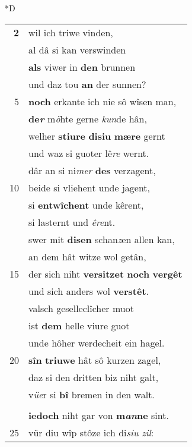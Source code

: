 \documentclass[8pt,a4paper,notitlepage]{article}
\begin{document}
\begin{table}[ht]
\begin{minipage}[t]{0.5\linewidth}
\small
\begin{center}*D
\end{center}
\begin{tabular}{rl}
\textbf{2} & wil ich triwe vinden,\\ 
 & al dâ si kan verswinden\\ 
 & \textbf{als} viwer in \textbf{den} brunnen\\ 
 & und daz tou \textbf{an} der sunnen?\\ 
5 & \textbf{noch} erkante ich nie sô wîsen man,\\ 
 & \textbf{de\textit{r}} m\textit{ö}hte gerne \textit{kun}de hân,\\ 
 & welher \textbf{stiure} \textbf{disiu} \textbf{mære} gernt\\ 
 & und waz si guoter lê\textit{re} wernt.\\ 
 & dâr an si ni\textit{mer} \textbf{des} verzagent,\\ 
10 & beide si vliehent unde jagent,\\ 
 & si \textbf{entwîchent} unde kêrent,\\ 
 & si lasternt und \textit{êre}nt.\\ 
 & swer mit \textbf{disen} schan\textit{z}en allen kan,\\ 
 & an dem hât witze wol getân,\\ 
15 & der sich niht \textbf{versitzet} \textbf{noch} \textbf{vergêt}\\ 
 & und sich anders wol \textbf{verstêt}.\\ 
 & valsch geselleclîcher muot\\ 
 & ist \textbf{dem} helle viure guot\\ 
 & unde hôher werdecheit ein hagel.\\ 
20 & \textbf{sîn} \textbf{triuwe} hât sô kurzen zagel,\\ 
 & daz si den dritten biz niht galt,\\ 
 & v\textit{üe}r si \textbf{bî} bremen in den walt.\\ 
 & \textit{\begin{large}D\end{large}}is\textit{e} maneger slahte \textit{underbint}\\ 
 & \textbf{iedoch} niht gar von \textbf{m\textit{an}ne} sint.\\ 
25 & vür diu wîp stôze ich di\textit{siu zil}:\\ 

\end{tabular}
\end{minipage}
\end{table}
\end{document}
